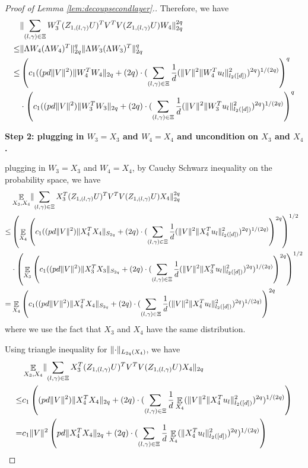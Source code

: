 \documentclass[11pt]{amsart}
\numberwithin{equation}{section}
\numberwithin{equation}{section}
\DeclareMathOperator{\E}{\mathbb{E}}
\DeclarePairedDelimiter{\norm}{\lVert}{\rVert}
\begin{document}
\begin{proof}[Proof of Lemma \ref{lem:decoupsecondlayer}.]
Therefore, we have
\begin{align*}
    &\norm{\sum \limits_{(l,\gamma) \in \Xi}W_3^T(Z_{1,(l,\gamma)}U)^TV^TV( Z_{1,(l,\gamma)}U)W_4}_{2q}^{2q}
    \\ \le & \norm{\Lambda W_4(\Lambda W_4)^T}_{2q}^q\norm{\Lambda W_3(\Lambda W_3)^T}_{2q}^q
    \\ \le & \left(c_1 ((pd\norm{V}^2)\norm{W_4^TW_4}_{2q}+(2q)\cdot (\sum\limits_{(l,\gamma) \in \Xi}\frac{1}{d}(\norm{V}^2\norm{W_4^Tu_l}_{l_2([d])}^{2})^{2q})^{1/(2q)}\right)^q \\ & \cdot \left(c_1 ((pd\norm{V}^2)\norm{W_3^TW_3}_{2q}+(2q)\cdot (\sum\limits_{(l,\gamma) \in \Xi}\frac{1}{d}(\norm{V}^2\norm{W_3^Tu_l}_{l_2([d])}^{2})^{2q})^{1/(2q)}\right)^q
\end{align*}

\textbf{Step 2: plugging in $W_3=X_3$ and $W_4=X_4$ and uncondition on $X_3$ and $X_4$.}

plugging in $W_3=X_3$ and $W_4=X_4$, by Cauchy Schwarz inequality on the probability space, we have
\begin{align*}
    &\E_{X_3,X_4}\norm{\sum \limits_{(l,\gamma) \in \Xi}X_3^T(Z_{1,(l,\gamma)}U)^TV^TV( Z_{1,(l,\gamma)}U)X_4}_{2q}^{2q}
    \\ \le & \left(\E_{X_4}\left(c_1 ((pd\norm{V}^2)\norm{X_4^TX_4}_{S_{2q}}+(2q)\cdot (\sum\limits_{(l,\gamma) \in \Xi}\frac{1}{d}(\norm{V}^2\norm{X_4^Tu_l}_{l_2([d])}^{2})^{2q})^{1/(2q)}\right)^{2q}\right)^{1/2} \\ & \cdot \left(\E_{X_3}\left(c_1 ((pd\norm{V}^2)\norm{X_3^TX_3}_{S_{2q}}+(2q)\cdot (\sum\limits_{(l,\gamma) \in \Xi}\frac{1}{d}(\norm{V}^2\norm{X_3^Tu_l}_{l_2([d])}^{2})^{2q})^{1/(2q)}\right)^{2q}\right)^{1/2}
    \\=&\E_{X_4}\left(c_1 ((pd\norm{V}^2)\norm{X_4^TX_4}_{S_{2q}}+(2q)\cdot (\sum\limits_{(l,\gamma) \in \Xi}\frac{1}{d}(\norm{V}^2\norm{X_4^Tu_l}_{l_2([d])}^{2})^{2q})^{1/(2q)}\right)^{2q}
\end{align*}
where we use the fact that $X_3$ and $X_4$ have the same distribution.

Using triangle inequality for $\norm{\cdot}_{L_{2q}(X_4)}$, we have
\begin{align*}
    &\E_{X_3,X_4}\norm{\sum \limits_{(l,\gamma) \in \Xi}X_3^T(Z_{1,(l,\gamma)}U)^TV^TV( Z_{1,(l,\gamma)}U)X_4}_{2q} \\\le& c_1 \left((pd\norm{V}^2)\norm{X_4^TX_4}_{2q}+(2q)\cdot (\sum\limits_{(l,\gamma) \in \Xi}\frac{1}{d}\E_{X_4}(\norm{V}^2\norm{X_4^Tu_l}_{l_2([d])}^{2})^{2q})^{1/(2q)}\right)
    \\=& c_1 \norm{V}^2\left(pd\norm{X_4^TX_4}_{2q}+(2q)\cdot (\sum\limits_{(l,\gamma) \in \Xi}\frac{1}{d}\E_{X_4}(\norm{X_4^Tu_l}_{l_2([d])}^{2})^{2q})^{1/(2q)}\right)
\end{align*}


\end{proof}
\end{document}
